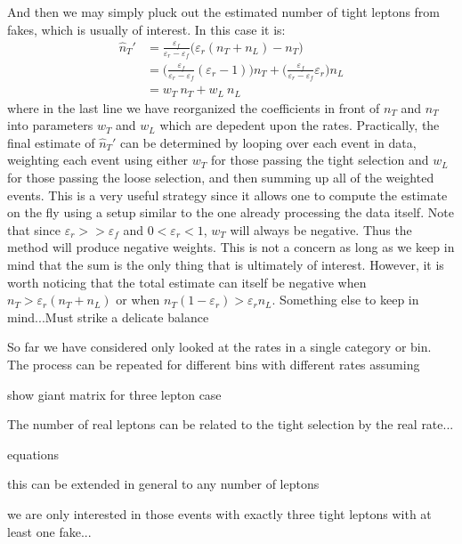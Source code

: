 And then we may simply pluck out the estimated number of tight leptons
from fakes, which is usually of interest. In this case it is:
\begin{align}
\hat{n}_T' &= \frac{\varepsilon_f}{\varepsilon_r-\varepsilon_f} \Big( \varepsilon_r(n_T+n_L) - n_T \Big)  \\
           &= \Big( \frac{\varepsilon_f}{\varepsilon_r-\varepsilon_f} 
	      (\varepsilon_r - 1)\Big) n_T 
	      + \Big(\frac{\varepsilon_f}{\varepsilon_r-\varepsilon_f} \varepsilon_r \Big)n_L\\
           &= w_T~n_T + w_L~n_L
\end{align}
where in the last line we have reorganized the coefficients in front
of $n_T$ and $n_T$ into parameters $w_T$ and $w_L$ which are depedent
upon the rates. Practically, the final estimate of $\hat{n}_T'$
can be determined by looping over each event in data, weighting each event
using either $w_T$ for those passing the tight selection and
$w_L$ for those passing the loose selection, and then 
summing up all of the weighted events.  This is a very useful 
strategy since it allows one to compute the estimate on the fly
using a setup similar to the one already processing the data itself. %
Note that since $\varepsilon_r>>\varepsilon_f$ and $0<\varepsilon_r<1$,
$w_T$ will always be negative. Thus the method will produce negative weights.
This is not a concern as long as we keep in mind that the sum
is the only thing that is ultimately of interest.
However, it is worth noticing that the total estimate can itself
be negative when $n_T>\varepsilon_r (n_T+n_L)$ or when
$n_T(1-\varepsilon_r) > \varepsilon_r n_L$. 
Something else to keep in mind...Must strike a delicate balance






So far we have considered only looked at the rates
in a single category or bin. The process can be repeated for different
bins with different rates assuming 

show giant matrix for three lepton case

The number of real leptons 
can be related to the tight selection by the real rate...


equations

this can be extended in general to any number of leptons

we are only interested in those events with exactly three tight leptons
with at least one fake...


